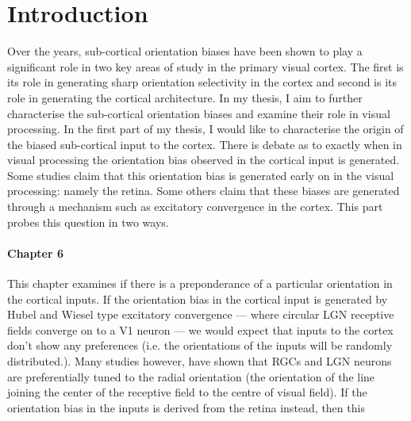 \chapter{Introduction}
Over the years, sub-cortical orientation biases have been shown to play a significant role in  two key areas of study in the primary visual cortex. The first is its role in generating sharp orientation selectivity in the cortex and second is its role in generating the cortical architecture. In my thesis, I aim to further characterise the sub-cortical orientation biases and examine their role in visual processing. In the first part of my thesis, I would like to characterise the origin of the biased sub-cortical input to the cortex. There is debate as to exactly when in visual processing the orientation bias observed in the cortical input is generated. Some studies claim that this orientation bias is generated early on in the visual processing: namely the retina. Some others claim that these biases are generated through a mechanism such as excitatory convergence in the cortex. This part probes this question in two ways. 

\subsubsection{Chapter 6}

This chapter examines if there is a preponderance of a particular orientation in the cortical inputs. If the orientation bias in the cortical input is generated by Hubel and Wiesel type excitatory convergence --- where circular LGN receptive fields converge on to a V1 neuron --- we would expect that inputs to the cortex don't show any preferences (i.e. the orientations of the inputs will be randomly distributed.). Many studies however, have shown that RGCs and LGN neurons are preferentially tuned to the radial orientation (the orientation of the line joining the center of the receptive field to the centre of visual field). If the orientation bias in the inputs is derived from the retina instead, then this 
	
	